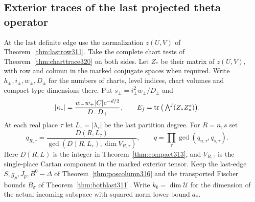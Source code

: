 \documentclass[a4paper,11pt]{article}
\theoremstyle{definition}
\theoremstyle{remark}
\numberwithin{equation}{section}
\begin{document}
\subsection{Exterior traces of the last projected theta operator}\label{nav:IX-67}
At the last definite edge use the normalization \(z(U,V)\)
of Theorem~\ref{thm:lastrow311}. Take the complete chart
tests of Theorem~\ref{thm:charttrace320} on both sides.
Let \(Z_*\) be their matrix of \(z(U,V)\), with row and
column in the marked conjugate spaces when required.
Write \(h_\pm,i_\pm,w_\pm,D_\pm\) for the numbers of
charts, level indices, chart volumes and compact type
dimensions there. Put \(s_\pm=i_\pm^2 w_\pm/D_\pm\) and
\[
  |\kappa_*|={w_-w_+|C|c^{-d/2}\over D_-D_+},\qquad
  E_j=\operatorname{tr}\big(\textstyle\bigwedge^j(Z_*Z_*^*)\big).
\]
At each real place \(\tau\) let \(L_\tau=|\lambda_\tau|\)
be the last partition degree. For \(R=n,s\) set
\[
 q_{R,\tau}=
 \frac{D(R,L_\tau)}
 {\gcd(D(R,L_\tau),\dim V_{R,\tau})},\qquad
 q=\prod_\tau\gcd(q_{n,\tau},q_{s,\tau}).
\]
Here \(D(R,L)\) is the integer in
Theorem~\ref{thm:compact313}, and \(V_{R,\tau}\) is the
single-place Cartan component in the marked exterior
tensor. Keep the last-edge \(S,g_p,J_p,B^0-\Delta\)
of Theorem~\ref{thm:poscolumn316} and the transported
Fischer bounds \(B_\sigma\) of Theorem~\ref{thm:bothlast311}.
Write \(k_0=\dim\mathcal U\) for the dimension of the
actual incoming subspace with squared norm lower bound \(a_*\).
\end{document}
